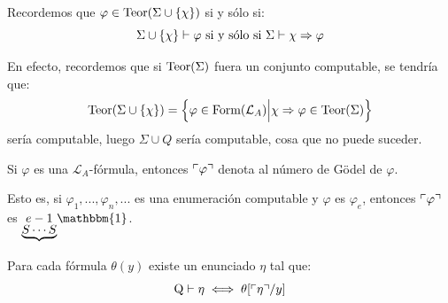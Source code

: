 \documentclass[12pt]{report}
\theoremstyle{largebreak}
\newcommand{\bbm}[1]{\ensuremath{\mathbbm{#1}}}
\begin{document}
    \begin{obs}
        Recordemos que $\varphi\in\textup{Teor}(\Sigma\cup\left\{\chi\right\})$ si y sólo si:
        \begin{equation*}
            \Sigma\cup\left\{\chi \right\}\vdash\varphi\textup{ si y sólo si }\Sigma\vdash\chi\Rightarrow\varphi
        \end{equation*}
    \end{obs}
    
    En efecto, recordemos que si $\textup{Teor}(\Sigma)$ fuera un conjunto computable, se tendría que:
    \begin{equation*}
        \textup{Teor}(\Sigma\cup\left\{\chi\right\})=\left\{\varphi\in\textup{Form}(\mathcal{L}_A)\Big|\chi\Rightarrow\varphi\in\textup{Teor}(\Sigma) \right\}
    \end{equation*}
    sería computable, luego $\Sigma\cup Q$ sería computable, cosa que no puede suceder.

    \begin{obs}
        Si $\varphi$ es una $\mathcal{L}_A$-fórmula, entonces $\ulcorner\varphi\urcorner$ denota al número de Gödel de $\varphi$.
        
        Esto es, si $\varphi_1,...,\varphi_n,...$ es una enumeración computable y $\varphi$ es $\varphi_e$, entonces $\ulcorner\varphi\urcorner$ es $\underset{\underbrace{S\cdots S}}{e-1}\bbm{1}$.
    \end{obs}

    \begin{lema}
        Para cada fórmula $\theta(y)$ existe un enunciado $\eta$ tal que:
        \begin{equation*}
            \textup{Q}\vdash\eta\iff\theta[\ulcorner\eta\urcorner/y]
        \end{equation*}
    \end{lema}

    \newcommand{\RA}{\textup{Q}}
\end{document}
